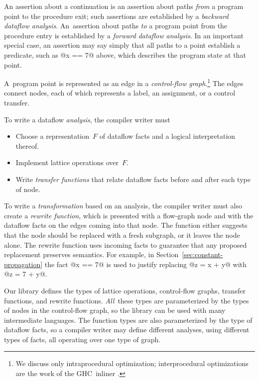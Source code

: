 \documentclass[blockstyle,preprint,natbib,nocopyrightspace]{sigplanconf}
\let\cite\citep
\newcommand{\authornote}[1]{{\em #1}}
\def\authornote#1{\unskip\relax}
\newcommand{\simon}[1]{\authornote{SLPJ: #1}}
\newcommand\secref[1]{Section~\ref{sec:#1}}
\begin{document}
An assertion about a continuation is an assertion about paths
\emph{from} a program point 
to the procedure {exit};
such assertions are established by a \emph{backward dataflow analysis}.
An~assertion about paths \emph{to} a program point from the procedure
{entry} is established by a \emph{forward dataflow analysis}.
In an important special case,
an assertion may say simply
that all paths to a point establish a predicate, such as @x == 7@
above, which describes the program 
state at that point.


A~program point is represented as an edge in
a \emph{control-flow graph}.\footnote
{We discuss only intraprocedural optimization;
interprocedural optimizations are the work of the GHC~inliner
\cite{peyton-jones:secrets-inliner}.} 
The edges connect nodes, each of which represents a label, an assignment, or
a control transfer.

To write a dataflow \emph{analysis}, the compiler
writer must 
\begin{itemize}
\item
Choose a representation~$F$ of dataflow facts and a logical interpretation
thereof.
\item
Implement lattice operations over~$F$.
\item
Write \emph{transfer functions} that relate dataflow facts before and
after each type of node.
\simon{I'd italicise key words from all three bullets, or none. NR:
It's not a question of bullets; the key concepts which are possibly
new to readers are transfer
functions and rewrite functions, which is why they are italicized.}
\end{itemize}

To write a \emph{transformation}
based on an analysis, the compiler writer
must also
create a \emph{rewrite function}, which is presented with a
flow-graph node and with the dataflow facts on the edges coming
into that node.
The function either suggests that the node should be replaced with a
fresh subgraph, or it leaves the node alone.
The rewrite function uses incoming facts to guarantee that
any proposed replacement preserves semantics.
For example, in \secref{constant-propagation} the fact @x == 7@ is
used to justify replacing @z = x + y@ with @z = 7 + y@.

Our library defines the types of lattice operations,
control-flow graphs, transfer functions, and rewrite functions.
\emph{All}~these types are parameterized by the types of
nodes in the control-flow graph, so
the library can be used with many intermediate languages.
The function types are also parameterized by the type of dataflow
facts, so a compiler writer may define different analyses, 
using different types of facts,
all operating over one type of graph. 
\end{document}

